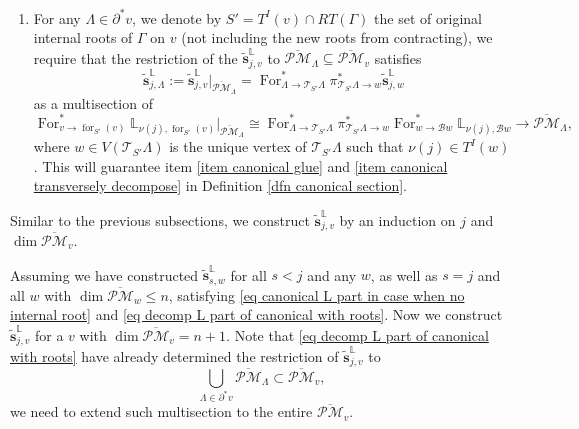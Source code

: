 \documentclass[11pt]{amsart}
\theoremstyle{definition}
\theoremstyle{remark}
\newcommand{\oPMb}{{\overline{\mathcal{PM}}}}
\newcommand{\<}{\left<}
\renewcommand{\>}{\right>}
\numberwithin{equation}{section}
\begin{document}
\begin{enumerate}
      \item For any $\Lambda\in \partial^* v$, we denote by $S'=T^I(v)\cap RT(\Gamma)$ the set of original internal roots of $\Gamma$ on $v$ (not including the new roots from contracting), we require that  the restriction of the  
        $\tilde{\bm s}_{j,v}^{\mathbb L}$ to $\oPMb_{\Lambda}\subseteq \oPMb_{ v}$ satisfies
    \begin{equation}\label{eq decomp L part of canonical with roots}
    \tilde{\bm s}_{j,\Lambda}^{\mathbb L}:=\tilde{\bm s}_{j,v}^{\mathbb L}\vert_{\oPMb_{ \Lambda}}= \operatorname{For}^*_{\Lambda \to \mathcal T_{S'}\Lambda} 
     \pi^*_{\mathcal T_{S'}\Lambda \to w}   \tilde{\bm s}_{j,w}^{\mathbb L}
    \end{equation}
    as a multisection of 
    $$
     \operatorname{For}^*_{v\to \operatorname{for}_{S'}(v)}\mathbb L_{\nu(j),\operatorname{for}_{S'}(v)}\big\vert_{\oPMb_{\Lambda}} 
     \cong  
     \operatorname{For}^*_{\Lambda \to \mathcal T_{S'}\Lambda} 
     \pi^*_{\mathcal T_{S'}\Lambda \to w} \operatorname{For}^*_{w\to \mathcal B w}\mathbb L_{\nu(j),\mathcal B w} \to \oPMb_{ \Lambda},
    $$
    where $w\in V(\mathcal T_{S'}\Lambda)$ is the unique vertex of $\mathcal T_{S'}\Lambda$ such that $\nu(j)\in T^I(w)$.
    This will guarantee item \ref{item canonical glue} and \ref{item canonical transversely decompose} in Definition \ref{dfn canonical section}.
    \end{enumerate}

    Similar to the previous subsections, we construct $ \tilde{\bm s}^{\mathbb L}_{j,v}$ by an induction on $j$ and $\dim \oPMb_v$.

    Assuming we have constructed $ \tilde{\bm s}^{\mathbb L}_{s,w}$ for all $s<j$ and any $w$,  as well as  $s=j$ and all $w$  with $\dim \oPMb_w \le n$, satisfying \eqref{eq canonical L part in case when no internal root} and \eqref{eq decomp L part of canonical with roots}. Now we construct $ \tilde{\bm s}^{\mathbb L}_{j,v}$ for a $v$ with $\dim \oPMb_v = n+1$. Note that \eqref{eq decomp L part of canonical with roots} have already determined the restriction of  $ \tilde{\bm s}^{\mathbb L}_{j,v}$ to 
    $$\bigcup_{\Lambda\in \partial^* v}\oPMb_{\Lambda}\subset \oPMb_{v},$$ 
    we need to extend such multisection to the entire $\oPMb_{v}$. 
\end{document}

